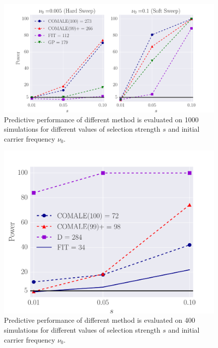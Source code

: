 \documentclass[11pt]{article}
\begin{document}
\begin{figure}[H]
	\centering
	\includegraphics[trim=.2in 0 .2in 0 , clip,width=\textwidth]{figures/power.pdf}
	\caption{Predictive performance of different method is evaluated on 1000 
		simulations for different values of selection strength $s$ and initial 
		carrier frequency $\nu_0$.} \label{fig:power}
\end{figure}
\begin{figure}[H]
	\centering
	\includegraphics[trim=.2in 0 .2in 0 , clip,width=\textwidth]{figures/powerSFS.pdf}
	\caption{Predictive performance of different method is evaluated on 400 
		simulations for different values of selection strength $s$ and initial 
		carrier frequency $\nu_0$.} \label{fig:powerSFS}
\end{figure}
\end{document}
